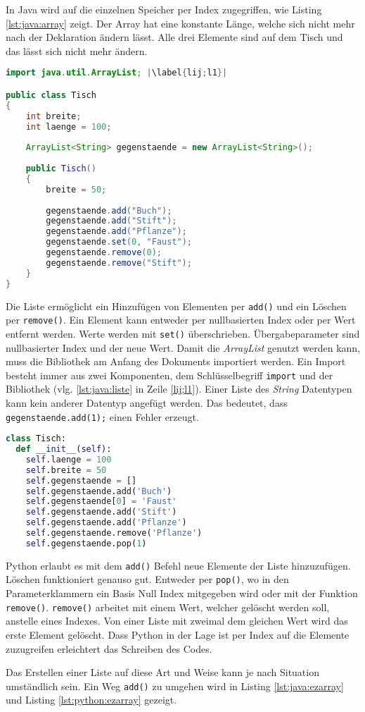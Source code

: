 In Java wird auf die einzelnen Speicher per Index zugegriffen, wie Listing \ref{lst:java:array} zeigt. Der Array hat eine konstante Länge, welche sich nicht mehr nach der Deklaration ändern lässt. Alle drei Elemente sind auf dem Tisch und das lässt sich nicht mehr ändern.
\newpage
\begin{lstlisting}[language=java,caption={Liste in Java},captionpos=b,label={lst:java:liste},frame=none,escapechar=|]
import java.util.ArrayList; |\label{lij;l1}|

public class Tisch
{
    int breite;
    int laenge = 100;
  
    ArrayList<String> gegenstaende = new ArrayList<String>();
  
    public Tisch()
    {
        breite = 50;
    
        gegenstaende.add("Buch");
        gegenstaende.add("Stift");
        gegenstaende.add("Pflanze");
        gegenstaende.set(0, "Faust");
        gegenstaende.remove(0);
        gegenstaende.remove("Stift");
    }
}
\end{lstlisting}

Die Liste ermöglicht ein Hinzufügen von Elementen per \texttt{add()} und ein Löschen per \texttt{remove()}. Ein Element kann entweder per nullbasierten Index oder per Wert entfernt werden. Werte werden mit \texttt{set()} überschrieben. Übergabeparameter sind nullbasierter Index und der neue Wert. Damit die \textit{ArrayList} genutzt werden kann, muss die Bibliothek am Anfang des Dokuments importiert werden. Ein Import besteht immer aus zwei Komponenten, dem Schlüsselbegriff \texttt{import}  und der Bibliothek (vlg. \ref{lst:java:liste} in Zeile \ref{lij;l1}). Einer Liste des \textit{String} Datentypen kann kein anderer Datentyp angefügt werden. Das bedeutet, dass \texttt{gegenstaende.add(1);} einen Fehler erzeugt.

\begin{lstlisting}[language=python,caption={Liste in Python},captionpos=b,label={lst:python:liste},frame=none]
class Tisch:
  def __init__(self):
    self.laenge = 100
    self.breite = 50
    self.gegenstaende = []
    self.gegenstaende.add('Buch')
    self.gegenstaende[0] = 'Faust'
    self.gegenstaende.add('Stift')
    self.gegenstaende.add('Pflanze')
    self.gegenstaende.remove('Pflanze')
    self.gegenstaende.pop(1)
\end{lstlisting}

Python erlaubt es mit dem \texttt{add()} Befehl neue Elemente der Liste hinzuzufügen. Löschen funktioniert genauso gut. Entweder per \texttt{pop()}, wo in den Parameterklammern ein Basis Null Index mitgegeben wird oder mit der Funktion \texttt{remove()}. \texttt{remove()} arbeitet mit einem Wert, welcher gelöscht werden soll, anstelle eines Indexes. Von einer Liste mit zweimal dem gleichen Wert wird das erste Element gelöscht. Dass Python in der Lage ist per Index auf die Elemente zuzugreifen erleichtert das Schreiben des Codes.\par
Das Erstellen einer Liste auf diese Art und Weise kann je nach Situation umständlich sein. Ein Weg \texttt{add()} zu umgehen wird in Listing \ref{lst:java:ezarray} und Listing \ref{lst:python:ezarray} gezeigt.

